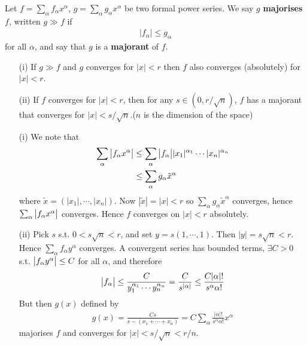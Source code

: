\documentclass[12pt,a4paper]{report}
\newenvironment{proof}
{\begin{changemargin}{1cm}{0.5cm} 
	}%
	{\end{changemargin}
}
\begin{document}
 Let $f = \sum_{\alpha} f_{\alpha} x^{\alpha}$, $g= \sum_{\alpha} g_{\alpha} x^{\alpha}$ be two formal power series. We say $g$ \textbf{majorises} $f$, written $g \gg f$ if
\begin{align*}
\big|f_{\alpha} \big| \leq g_{\alpha}
\end{align*}
for all $\alpha$, and say that $g$ is a \textbf{majorant} of $f$.
\s

\lem \begin{itemize}
\item[(i)] If $g\gg f$ and $g$ converges for $|x|<r$ then $f$ also converges (absolutely) for $|x| <r$.
\item[(ii)] If $f$ converges for $|x|<r$, then for any $s\in (0,r/\sqrt{n})$, $f$ has a majorant that converges for $|x|<s/\sqrt{n}$.($n$ is the dimension of the space)
\end{itemize}
\begin{proof}
\pf \begin{itemize}
\item[(i)] We note that
\begin{align*}
\sum_{\alpha} \big| f_{\alpha} x^{\alpha} \big| &\leq \sum_{\alpha} \big| f_{\alpha} \big| |x_1|^{\alpha_1} \cdots |x_n|^{\alpha_n} \\
&\leq \sum_{\alpha} g_{\alpha} \tilde{x}^{\alpha}
\end{align*}
where $\tilde{x} = (|x_1|,\cdots,|x_n|)$. Now $|\tilde{x}| = |x|  <r$ so $\sum_{\alpha} g_{\alpha} \tilde{x}^{\alpha}$ converges, hence $\sum_{\alpha} \big| f_{\alpha} x^{\alpha} \big|$ converges. Hence $f$ converges on $|x|<r$ absolutely. 
\item[(ii)] Pick $s$ s.t. $0<s\sqrt{n} <r$, and set $y=s(1,\cdots,1)$. Then $|y| = s\sqrt{n} <r$. Hence $\sum_{\alpha}f_{\alpha}y^{\alpha}$ converges. A convergent series has bounded terms, $\exists C>0$ s.t. $\big| f_{\alpha}y^{\alpha} \big| \leq C$ for all $\alpha$, and therefore
\begin{align*}
\big| f_{\alpha} \big| \leq \frac{C}{y_1^{\alpha_1} \cdots y_n^{\alpha_n}} = \frac{C}{s^{|\alpha|}} \leq \frac{C |\alpha|!}{s^{\alpha} \alpha!}
\end{align*}
But then $g(x)$ defined by
\begin{align*}
g(x) = \frac{Cs}{s-(x_1 + \cdots + x_n)}  = C \sum_{\alpha} \frac{|\alpha|!}{s^{\alpha}\alpha!}x^{\alpha}
\end{align*}
majorises $f$ and converges for $|x|<s/\sqrt{n}<r/n$.
\end{itemize}

\eop
\end{proof}
\s
\end{document}
